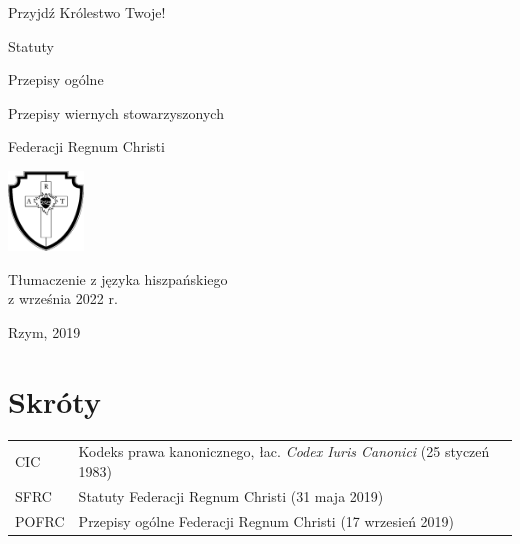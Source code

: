 \documentclass{book}
\begin{document}
\pagestyle{plain}

\begin{titlepage}
\begin{center}

Przyjdź Królestwo Twoje!

\vspace*{2cm}

{\Huge Statuty}

{\Huge Przepisy ogólne}

{\Huge Przepisy wiernych stowarzyszonych}

\vspace*{0.5cm}

{\Huge Federacji Regnum Christi}


\vspace*{1cm}

\includegraphics[width=2cm]{rc-logo-bw-712-755}

\vspace*{1cm}

Tłumaczenie z języka hiszpańskiego\\
z września 2022 r.

\vfill

Rzym, 2019
            
\end{center}
\end{titlepage}


\cleardoublepage

\tableofcontents
\cleardoublepage


\section*{Skróty}

\begin{tabular}{lp{}}

CIC & Kodeks prawa kanonicznego, łac. {\em Codex Iuris Canonici} (25 styczeń 1983) \\
SFRC & Statuty Federacji Regnum Christi (31 maja 2019) \\
POFRC & Przepisy ogólne Federacji Regnum Christi (17 wrzesień 2019)

\end{tabular}
\end{document}
